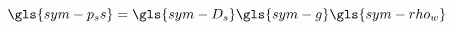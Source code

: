 
\begin{equation}\label{eq:p_ss}
  \gls{sym-p_ss} = \gls{sym-D_s} \gls{sym-g} \gls{sym-rho_w}
\end{equation}
